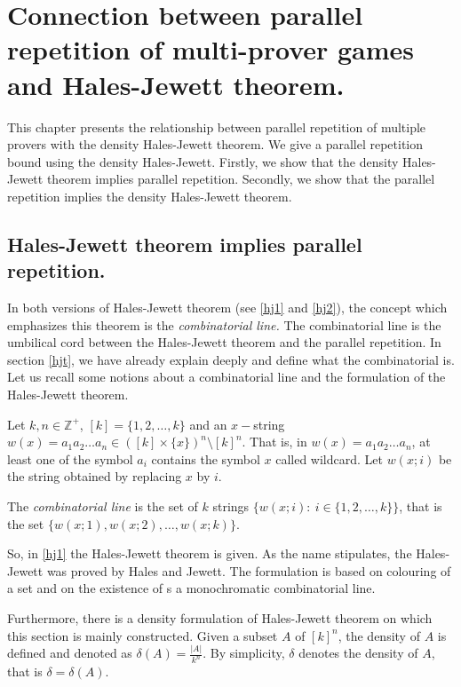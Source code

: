 

\chapter{Connection between parallel repetition of multi-prover games and  Hales-Jewett theorem.}

This chapter presents the relationship between parallel repetition of multiple provers with the density Hales-Jewett theorem. We give a parallel repetition bound using the density Hales-Jewett. Firstly, we show that the density Hales-Jewett theorem implies parallel repetition. Secondly, we show that the parallel repetition implies the density Hales-Jewett theorem.

\section{Hales-Jewett theorem implies parallel repetition.}

In both versions of Hales-Jewett theorem (see \eqref{hj1} and \eqref{hj2}), the concept which emphasizes this theorem is the \textit{combinatorial line.} The combinatorial line is the umbilical cord between the Hales-Jewett theorem and the parallel repetition. In section \eqref{hjt}, we have already explain deeply
and define what the combinatorial is. Let us recall some notions about a combinatorial line and the formulation of the Hales-Jewett theorem.

Let $k, n\in \mathbb{Z}^+$, $[k]=\{1,2, \ldots,k\}$ and an $x-$string $w(x)=a_1a_2\ldots a_n \in ([k]\times\{x\})^n\setminus [k]^n.$ That is, in $w(x)=a_1a_2\ldots a_n$, at least one of the symbol   $a_i$ contains the symbol  $x$ called wildcard. Let $w(x;i)$ be the string obtained by replacing $x$ by $i$.

The \textit{combinatorial line} is the set of $k$ strings $\{w(x;i): \ i\in \{1,2,\ldots,k\} \}$, that is the set $\{w(x;1), w(x;2), \ldots, w(x;k)\}.$ 
 
So, in \eqref{hj1}  the Hales-Jewett theorem is given.
As the name stipulates, the Hales-Jewett was proved by Hales and Jewett. The formulation is based on colouring of a set and on the existence of s a monochromatic combinatorial line.

Furthermore, there is a density formulation of Hales-Jewett theorem on which this section is mainly constructed. Given a subset $A$ of $[k]^n$, the density of $A$ is defined and denoted as $\delta(A)=\frac{|A|}{k^n}.$ By simplicity, $\delta$ denotes the density of $A$, that is $\delta=\delta(A).$

